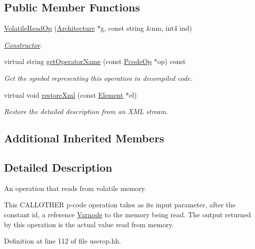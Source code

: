 \subsection*{Public Member Functions}
\begin{DoxyCompactItemize}
\item 
\mbox{\hyperlink{class_volatile_read_op_ac1160599dd0ba9ebf8370a039e24f9a2}{Volatile\+Read\+Op}} (\mbox{\hyperlink{class_architecture}{Architecture}} $\ast$g, const string \&nm, int4 ind)
\begin{DoxyCompactList}\small\item\em \mbox{\hyperlink{class_constructor}{Constructor}}. \end{DoxyCompactList}\item 
virtual string \mbox{\hyperlink{class_volatile_read_op_afb60313306e36c095f37000b325142a0}{get\+Operator\+Name}} (const \mbox{\hyperlink{class_pcode_op}{Pcode\+Op}} $\ast$op) const
\begin{DoxyCompactList}\small\item\em Get the symbol representing this operation in decompiled code. \end{DoxyCompactList}\item 
virtual void \mbox{\hyperlink{class_volatile_read_op_abdb0f4262d311abca0c8a3fe07ed758e}{restore\+Xml}} (const \mbox{\hyperlink{class_element}{Element}} $\ast$el)
\begin{DoxyCompactList}\small\item\em Restore the detailed description from an X\+ML stream. \end{DoxyCompactList}\end{DoxyCompactItemize}
\subsection*{Additional Inherited Members}


\subsection{Detailed Description}
An operation that reads from volatile memory. 

This C\+A\+L\+L\+O\+T\+H\+ER p-\/code operation takes as its input parameter, after the constant id, a reference \mbox{\hyperlink{class_varnode}{Varnode}} to the memory being read. The output returned by this operation is the actual value read from memory. 

Definition at line 112 of file userop.\+hh.



